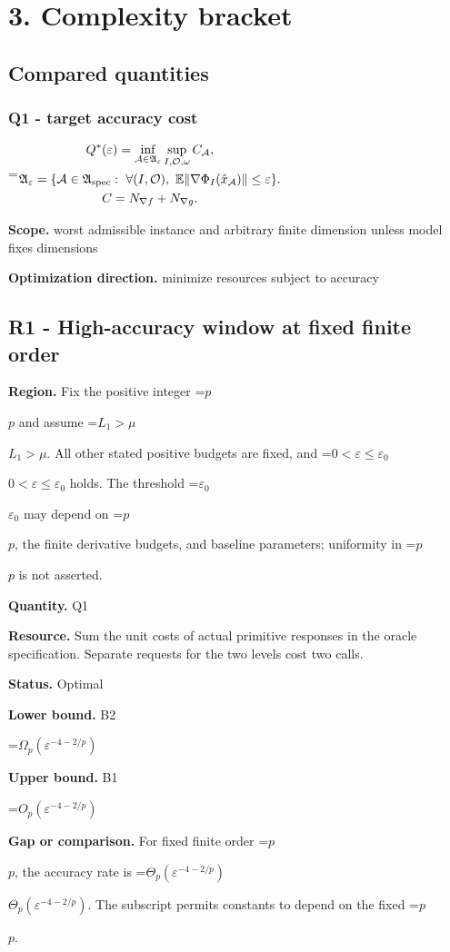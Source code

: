 \documentclass[10pt,a4paper]{article}
\newcommand{\AtlasMath}[1]{\par\begingroup\centering\setbox0=\hbox{$\displaystyle #1$}\ifdim\wd0>1.4\linewidth\typeout{ATLAS WIDE FORMULA: \the\wd0}\fi\ifdim\wd0>\linewidth\resizebox{\linewidth}{!}{\box0}\else\box0\fi\par\endgroup}
\newcommand{\AtlasInlineMath}[1]{\begingroup\setbox0=\hbox{$#1$}\ifdim\wd0>.4\linewidth\endgroup\AtlasMath{#1}\else\endgroup$#1$\fi}
\begin{document}
\section{3. Complexity bracket}
\subsection{Compared quantities}
\subsubsection{Q1 - target accuracy cost}
\AtlasMath{\begin{gathered}Q^*(\varepsilon)=\inf_{\mathcal A\in\mathfrak A_\varepsilon}\sup_{I,\mathcal O,\omega}C_{\mathcal A},\\\mathfrak A_\varepsilon=\{\mathcal A\in\mathfrak A_{\rm spec}:\ \forall(I,\mathcal O),\ \mathbb E\|\nabla\Phi_I(\hat x_{\mathcal A})\|\le\varepsilon\}.\\C=N_{\nabla f}+N_{\nabla g}.\end{gathered}}
\textbf{Scope.} worst admissible instance and arbitrary finite dimension unless model fixes dimensions

\textbf{Optimization direction.} minimize resources subject to accuracy

\subsection{R1 - High-accuracy window at fixed finite order}
\textbf{Region.} Fix the positive integer \AtlasInlineMath{p} and assume \AtlasInlineMath{L_1>\mu}. All other stated positive budgets are fixed, and \AtlasInlineMath{0<\varepsilon\le\varepsilon_0} holds. The threshold \AtlasInlineMath{\varepsilon_0} may depend on \AtlasInlineMath{p}, the finite derivative budgets, and baseline parameters; uniformity in \AtlasInlineMath{p} is not asserted.

\textbf{Quantity.} Q1

\textbf{Resource.} Sum the unit costs of actual primitive responses in the oracle specification. Separate requests for the two levels cost two calls.

\textbf{Status.} Optimal

\textbf{Lower bound.} B2

\AtlasMath{\Omega _p(\varepsilon ^{-4-2/p})}
\textbf{Upper bound.} B1

\AtlasMath{O_p(\varepsilon ^{-4-2/p})}
\textbf{Gap or comparison.} For fixed finite order \AtlasInlineMath{p}, the accuracy rate is \AtlasInlineMath{\Theta_p(\varepsilon^{-4-2/p})}. The subscript permits constants to depend on the fixed \AtlasInlineMath{p}.
\end{document}
